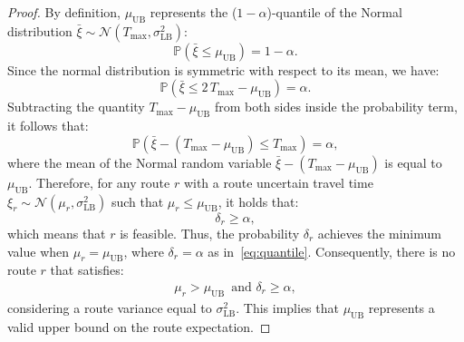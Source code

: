 \documentclass[10pt,a4paper]{amsart}
\begin{document}
\begin{proof}
By definition, $\mu_{\text{UB}}$ represents the (${1-\alpha}$)-quantile of the Normal distribution $\bar{\xi} \sim \mathcal{N}(T_{\max}, \sigma^2_{\text{LB}})$:
%
\[
\mathbb{P}(\bar{\xi} \leq \mu_{\text{UB}}) = 1 - \alpha.
\]
%
Since the normal distribution is symmetric with respect to its mean, we have:
%
\[
\mathbb{P}(\bar{\xi} \leq 2 \, T_{\max} - \mu_{\text{UB}}) = \alpha.
\]
%
Subtracting the quantity $T_{\max} - \mu_{\text{UB}}$ from both sides inside the probability term, it follows that:
\begin{equation}
\label{eq:quantile}
\mathbb{P}(\bar{\xi} - (T_{\max} - \mu_{\text{UB}}) \leq T_{\max}) = \alpha,
\end{equation}
where the mean of the Normal random variable $\bar{\xi} - (T_{\max} - \mu_{\text{UB}})$ is equal to $\mu_{\text{UB}}$.
Therefore, for any route $r$ with a route uncertain travel time $\xi_r \sim \mathcal{N}(\mu_r, \sigma^2_{\text{LB}})$ such that $\mu_r \leq \mu_{\text{UB}}$, it holds that:
%
\[
\delta_r \geq \alpha,
\]
%
which means that $r$ is feasible.
%
Thus, the probability $\delta_r$ achieves the minimum value when $\mu_r = \mu_{\text{UB}}$, where $\delta_r = \alpha$ as in~\eqref{eq:quantile}. Consequently, there is no route $r$ that satisfies:
%
\begin{align*}
\mu_r > \mu_{\text{UB}} \, \text{ and } \delta_r \geq \alpha,
\end{align*}
%
considering a route variance equal to $\sigma^2_{\text{LB}}$. This implies that $\mu_{\text{UB}}$ represents a valid upper bound on the route expectation.
\end{proof}
\end{document}
